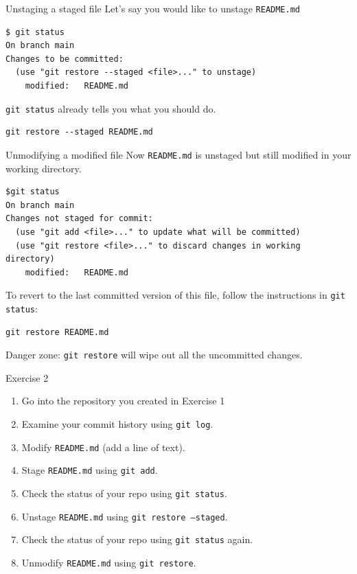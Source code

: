 \documentclass[handout]{beamer}
\begin{document}
\begin{frame}[fragile]{Unstaging a staged file}
Let's say you would like to unstage \texttt{README.md}
\begin{lstlisting}
$ git status
On branch main
Changes to be committed:
  (use "git restore --staged <file>..." to unstage)
	modified:   README.md
\end{lstlisting}
\texttt{git status} already tells you what you should do.
\begin{lstlisting}
git restore --staged README.md
\end{lstlisting}
\end{frame}

\begin{frame}[fragile]{Unmodifying a modified file}
Now \texttt{README.md} is unstaged but still modified in your working directory. 
\begin{lstlisting}
$git status
On branch main
Changes not staged for commit:
  (use "git add <file>..." to update what will be committed)
  (use "git restore <file>..." to discard changes in working directory)
	modified:   README.md
\end{lstlisting}
To revert to the last committed version of this file, follow the instructions in \texttt{git status}:
\begin{lstlisting}
git restore README.md
\end{lstlisting}
\alert{Danger zone}: \texttt{git restore} will wipe out all the uncommitted changes.
\end{frame}

\begin{frame}{Exercise 2}
	\begin{enumerate}
		\item Go into the repository you created in Exercise 1
		\item Examine your commit history using \texttt{git log}.
		\item Modify \texttt{README.md} (add a line of text).
		\item Stage \texttt{README.md} using \texttt{git add}. 
		\item Check the status of your repo using \texttt{git status}. 
		\item Unstage \texttt{README.md} using \texttt{git restore --staged}.
		\item Check the status of your repo using \texttt{git status} again. 
		\item Unmodify \texttt{README.md} using \texttt{git restore}.
	\end{enumerate}
\end{frame}
\end{document}
